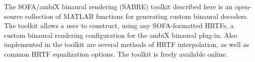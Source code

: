 The SOFA/ambiX binaural rendering (SABRE) toolkit described here is an open-source collection of MATLAB functions for generating custom binaural decoders.
The toolkit allows a user to construct, using any SOFA-formatted HRTFs, a custom binaural rendering configuration for the ambiX binaural plug-in.
Also implemented in the toolkit are several methods of HRTF interpolation, as well as common HRTF equalization options.
The toolkit is freely available online.